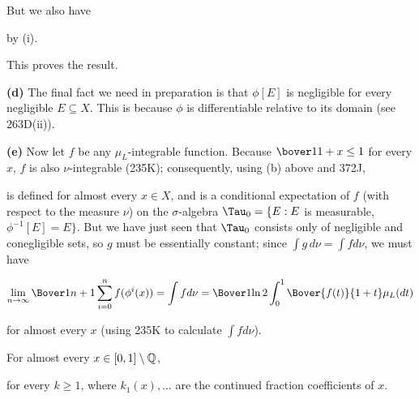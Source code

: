 {

\noindent But we also have


\noindent by (i).\   \Bang

This proves the result.\   \Qed

\medskip

{\bf (d)} The final fact we need in preparation is that $\phi[E]$ is
negligible for every negligible $E\subseteq X$.   This is because $\phi$
is differentiable relative to its domain (see 263D(ii)).

\medskip

{\bf (e)} Now let $f$ be any $\mu_L$-integrable function.   Because
$\bover1{1+x}\le 1$ for every $x$, $f$ is also $\nu$-integrable
(235K);   consequently, using (b) above and 372J,


\noindent is defined for almost every $x\in X$, and is a conditional
expectation of $f$ (with respect to the measure $\nu$) on the
$\sigma$-algebra $\Tau_0=\{E:E$ is measurable, $\phi^{-1}[E]=E\}$.
But we have just seen that $\Tau_0$ consists only of negligible and
conegligible sets, so $g$ must be essentially constant;  since
$\int g\,d\nu=\int fd\nu$, we must have

$$\lim_{n\to\infty}\Bover1{n+1}\sum_{i=0}^nf(\phi^i(x))
=\int fd\nu
=\Bover1{\ln 2}\int_0^1\Bover{f(t)}{1+t}\mu_L(dt)$$

\noindent for almost every $x$ (using 235K to calculate $\int fd\nu$).
}%

 For almost every $x\in [0,1]\setminus\Bbb Q$,


\noindent for every $k\ge 1$, where $k_1(x),\ldots$ are the continued
fraction coefficients of $x$.


